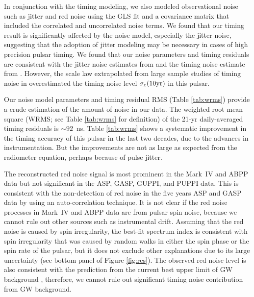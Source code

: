 In conjunction with the timing modeling, we also modeled observational noise
such as jitter and red noise
 using the GLS fit and a covariance matrix that included the
correlated and uncorrelated noise terms.
We found that our timing result is significantly affected by the noise
model, especially the jitter noise, suggesting that the adoption of jitter
modeling may be necessary in cases of high precision pulsar timing. 
We found that our noise parameters and timing residuals are consistent with the jitter
noise estimates from \citet{sc12} and the timing noise estimate from \citet{sc10}. However,
the scale law extrapolated from large sample studies of timing noise in \citet{hlk10}
overestimated the timing noise level $\sigma_z({\rm 10 yr})$ in this pulsar.

Our noise model parameters and timing residual RMS (Table \ref{tab:wrms})
provide a crude estimation of the amount of noise in our data. The weighted
root mean square (WRMS; see Table \ref{tab:wrms} for definition) of
the 21-yr daily-averaged timing residuals is $\sim 92$~ns. 
Table \ref{tab:wrms} shows a systematic improvement in the timing accuracy of
this pulsar in the last two decades, due to the advances in instrumentation.
But the improvements are not as large as expected from the radiometer 
equation, perhaps because of pulse jitter. 

The reconstructed red noise signal is most prominent in the Mark~IV and ABPP data
but not significant in the ASP, GASP, GUPPI, and PUPPI data.
This is consistent with the non-detection of red noise in the five years
ASP and GASP data by \citet{pjl+13} using an auto-correlation technique.
It is not clear if the red noise processes in Mark~IV and ABPP data
are from pulsar spin noise, because we cannot rule out other sources such as
instrumental drift.
Assuming that the red noise is caused by spin irregularity,
the best-fit spectrum index is consistent with
spin irregularity that was caused by random walks in
either the spin phase or the spin rate of the pulsar, but it does not exclude other explanations
due to its large uncertainty (see bottom panel of Figure \ref{fig:res}).
The observed red noise level is also consistent with the prediction
from the current best upper limit of GW background \citep{src+13}, therefore,
we cannot rule out significant timing noise contribution from GW background. 


